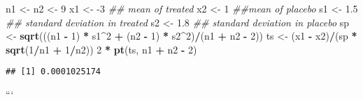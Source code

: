 \documentclass[
]{article}
\newenvironment{Shaded}{\begin{snugshade}}{\end{snugshade}}
\newcommand{\CommentTok}[1]{\textcolor[rgb]{0.56,0.35,0.01}{\textit{#1}}}
\newcommand{\DecValTok}[1]{\textcolor[rgb]{0.00,0.00,0.81}{#1}}
\newcommand{\FloatTok}[1]{\textcolor[rgb]{0.00,0.00,0.81}{#1}}
\newcommand{\KeywordTok}[1]{\textcolor[rgb]{0.13,0.29,0.53}{\textbf{#1}}}
\newcommand{\NormalTok}[1]{#1}
\newcommand{\OperatorTok}[1]{\textcolor[rgb]{0.81,0.36,0.00}{\textbf{#1}}}
\newcommand{\StringTok}[1]{\textcolor[rgb]{0.31,0.60,0.02}{#1}}
\begin{document}
\begin{Shaded}
\begin{Highlighting}[]
\NormalTok{n1 <-}\StringTok{ }\NormalTok{n2 <-}\StringTok{ }\DecValTok{9}
\NormalTok{x1 <-}\StringTok{ }\DecValTok{-3} \CommentTok{## mean of treated}
\NormalTok{x2 <-}\StringTok{ }\DecValTok{1} \CommentTok{##mean of placebo}
\NormalTok{s1 <-}\StringTok{ }\FloatTok{1.5} \CommentTok{## standard deviation in treated}
\NormalTok{s2 <-}\StringTok{ }\FloatTok{1.8} \CommentTok{## standard deviation in placebo}
\NormalTok{sp <-}\StringTok{ }\KeywordTok{sqrt}\NormalTok{(((n1 }\OperatorTok{-}\StringTok{ }\DecValTok{1}\NormalTok{) }\OperatorTok{*}\StringTok{ }\NormalTok{s1}\OperatorTok{^}\DecValTok{2} \OperatorTok{+}\StringTok{ }\NormalTok{(n2 }\OperatorTok{-}\StringTok{ }\DecValTok{1}\NormalTok{) }\OperatorTok{*}\StringTok{ }\NormalTok{s2}\OperatorTok{^}\DecValTok{2}\NormalTok{)}\OperatorTok{/}\NormalTok{(n1 }\OperatorTok{+}\StringTok{ }\NormalTok{n2 }\OperatorTok{-}\StringTok{ }\DecValTok{2}\NormalTok{))}
\NormalTok{ts <-}\StringTok{ }\NormalTok{(x1 }\OperatorTok{-}\StringTok{ }\NormalTok{x2)}\OperatorTok{/}\NormalTok{(sp }\OperatorTok{*}\StringTok{ }\KeywordTok{sqrt}\NormalTok{(}\DecValTok{1}\OperatorTok{/}\NormalTok{n1 }\OperatorTok{+}\StringTok{ }\DecValTok{1}\OperatorTok{/}\NormalTok{n2))}
\DecValTok{2} \OperatorTok{*}\StringTok{ }\KeywordTok{pt}\NormalTok{(ts, n1 }\OperatorTok{+}\StringTok{ }\NormalTok{n2 }\OperatorTok{-}\StringTok{ }\DecValTok{2}\NormalTok{)}
\end{Highlighting}
\end{Shaded}

\begin{verbatim}
## [1] 0.0001025174
\end{verbatim}

```
\end{document}
